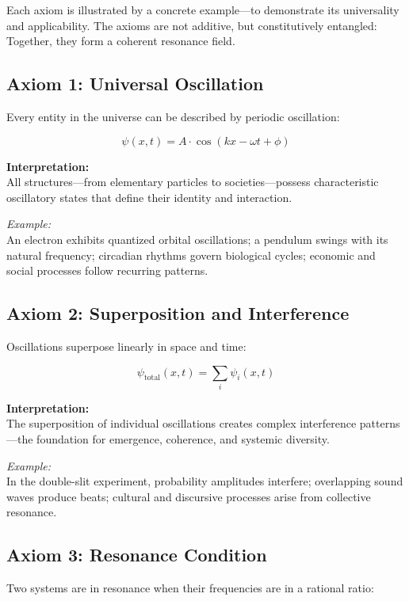 \documentclass[12pt]{iopart}
\providecommand{\text}[1]{\mbox{#1}}
\begin{document}
Each axiom is illustrated by a concrete example—to demonstrate its universality and applicability. The axioms are not additive, but constitutively entangled: Together, they form a coherent resonance field.

\subsection{Axiom 1: Universal Oscillation}

Every entity in the universe can be described by periodic oscillation:

$$
\psi(x, t) = A \cdot \cos(kx - \omega t + \phi)
$$

\textbf{Interpretation:}\\
All structures—from elementary particles to societies—possess characteristic oscillatory states that define their identity and interaction.

\textit{Example:}\\
An electron exhibits quantized orbital oscillations; a pendulum swings with its natural frequency; circadian rhythms govern biological cycles; economic and social processes follow recurring patterns.

\newpage

\subsection{Axiom 2: Superposition and Interference}

Oscillations superpose linearly in space and time:

$$
\psi_{\text{total}}(x, t) = \sum_i \psi_i(x, t)
$$

\textbf{Interpretation:}\\
The superposition of individual oscillations creates complex interference patterns—the foundation for emergence, coherence, and systemic diversity.

\textit{Example:}\\
In the double-slit experiment, probability amplitudes interfere; overlapping sound waves produce beats; cultural and discursive processes arise from collective resonance.

\subsection{Axiom 3: Resonance Condition}

Two systems are in resonance when their frequencies are in a rational ratio:
\end{document}
